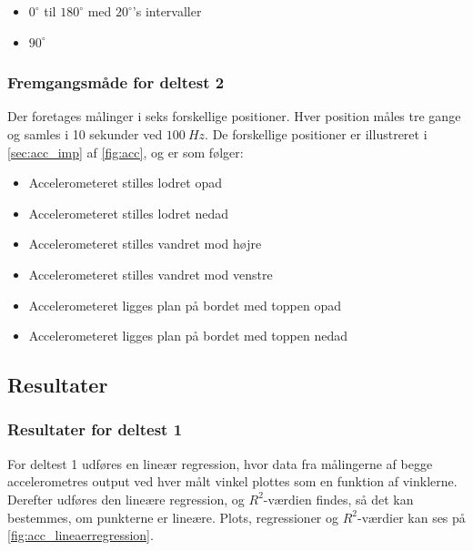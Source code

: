 \begin{itemize}
\item $0^{\circ}$ til $180^{\circ}$ med $20^{\circ}$'s intervaller
\item $90^{\circ}$  
\end{itemize}


\subsubsection{Fremgangsmåde for deltest 2}\label{sec:acc_fremgangsmaade}
Der foretages målinger i seks forskellige positioner. Hver position måles tre gange og samles i 10 sekunder ved $100~Hz$. De forskellige positioner er illustreret i \autoref{sec:acc_imp} af \autoref{fig:acc}, og er som følger: 
\begin{itemize}
\item Accelerometeret stilles lodret opad
\item Accelerometeret stilles lodret nedad
\item Accelerometeret stilles vandret mod højre
\item Accelerometeret stilles vandret mod venstre
\item Accelerometeret ligges plan på bordet med toppen opad
\item Accelerometeret ligges plan på bordet med toppen nedad
\end{itemize}

\subsection{Resultater} 

\subsubsection{Resultater for deltest 1} \label{sec:resul_linear}
For deltest 1 udføres en lineær regression, hvor data fra målingerne af begge accelerometres output ved hver målt vinkel plottes som en funktion af vinklerne. Derefter udføres den lineære regression, og $R^2$-værdien findes, så det kan bestemmes, om punkterne er lineære. Plots, regressioner og $R^2$-værdier kan ses på \autoref{fig:acc_lineaerregression}.

